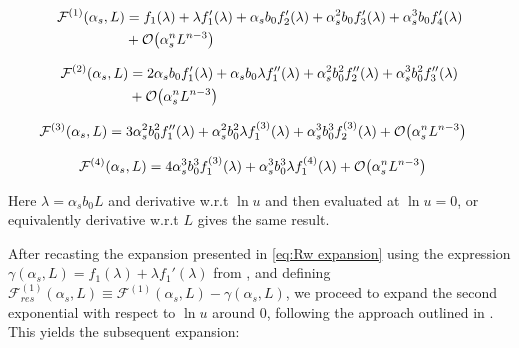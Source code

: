 \documentclass[../main.tex]{subfiles}
\begin{document}
\begin{align}
    \begin{split} \label{eq:derivative F1}
        \mathcal{F}^{(1)}(\alpha_s,L) &= f_1(\lambda )+\lambda  f_1'(\lambda )+\alpha_s b_0 f_2'(\lambda )+\alpha_s^2 b_0 f_3'(\lambda )+\alpha_s^3 b_0 f_4'(\lambda )\\
        &+ \order{\alpha_s^n L^{n-3}}
    \end{split}
\end{align}

\begin{align}
    \begin{split}\label{eq:derivative F2}
        \mathcal{F}^{(2)}(\alpha_s,L) &= 2 \alpha_s b_0 f_1'(\lambda ) + \alpha_s b_0 \lambda  f_1''(\lambda )+\alpha_s^2 b_0^2 f_2''(\lambda )+ \alpha_s^3 b_0^2 f_3''(\lambda )\\
        &+ \order{\alpha_s^n L^{n-3}}
    \end{split}
\end{align}

\begin{align}
    \begin{split}\label{eq:derivative F3}
        \mathcal{F}^{(3)}(\alpha_s,L) &=  3 \alpha_s^2 b_0^2 f_1''(\lambda )+\alpha_s^2 b_0^2 \lambda  f_1^{(3)}(\lambda )+\alpha_s^3 b_0^3 f_2^{(3)}(\lambda )+ \order{\alpha_s^n L^{n-3}}
    \end{split}
\end{align}

\begin{align}
    \begin{split}\label{eq:derivative F4}
        \mathcal{F}^{(4)}(\alpha_s,L) &= 4 \alpha_s^3 b_0^3 f_1^{(3)}(\lambda ) +\alpha_s^3 b_0^3 \lambda  f_1^{(4)}(\lambda )+ \order{\alpha_s^n L^{n-3}}
    \end{split}
\end{align}

Here $\lambda = \alpha_s b_0 L$ and derivative w.r.t $\ln u$ and then evaluated at $\ln u = 0$, or equivalently derivative w.r.t $L$ gives the same result.

After recasting the expansion presented in \cref{eq:Rw expansion} using the expression \\
$\gamma(\alpha_s,L) = f_1(\lambda) + \lambda f_1'(\lambda)$ from \cite{CATANI19933}, 
and defining $\mathcal{F}^{(1)}_{res}(\alpha_s,L) \equiv \mathcal{F}^{(1)}(\alpha_s,L) - \gamma(\alpha_s,L)$, we proceed to expand the second exponential with respect to $\ln u$ around 0, 
following the approach outlined in \cite{Aglietti:2002ew}. This yields the subsequent expansion:
\end{document}
